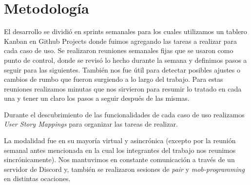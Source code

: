\section{Metodología}

El desarrollo se dividió en sprints semanales para los cuales utilizamos un tablero Kanban en Github Projects donde fuimos agregando las tareas a realizar para cada caso de uso. Se realizaron reuniones semanales fijas que se usaron como punto de control, donde se revisó lo hecho durante la semana y definimos pasos a seguir para las siguientes. También nos fue útil para detectar posibles ajustes o cambios de rumbo que fueron surgiendo a lo largo del trabajo. Para estas reuniones realizamos minutas que nos sirvieron para resumir lo tratado en cada una y tener un claro los pasos a seguir después de las mismas.

Durante el descubrimiento de las funcionalidades de cada caso de uso realizamos \textit{User Story Mappings} para organizar las tareas de realizar.

La modalidad fue en su mayoría virtual y asincrónica (excepto por la reunión semanal antes
mencionada en la cual los integrantes del trabajo nos reunimos sincrónicamente). Nos mantuvimos en constante comunicación a través de un servidor de Discord y, también se realizaron sesiones de \textit{pair} y \textit{mob-programming} en distintas ocaciones.